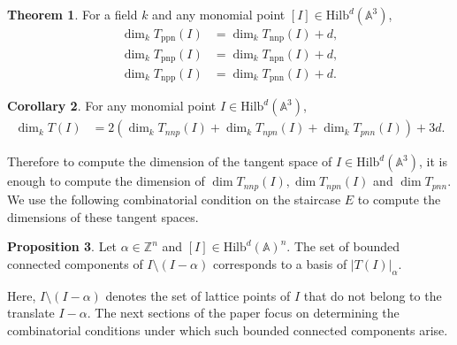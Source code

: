 \documentclass{amsart}[10pt]
\theoremstyle{plain}
\theoremstyle{definition}
\newtheorem{theorem}{Theorem}[section]
\newtheorem{corollary}[theorem]{Corollary}
\newtheorem{proposition}[theorem]{Proposition}
\newcommand{\Hilb}{\mathrm{Hilb}}
\begin{document}
\begin{theorem}
\cite[Theorem 2.4.]{AR}
For a field $k$ and any monomial point $[I] \in \Hilb^d (\mathbb{A}^3)$, 
\begin{align*}
\dim_{{k}} T_{\text{ppn}}(I) &= \dim_{{k}} T_{\text{nnp}}(I) + d, \\
\dim_{{k}} T_{\text{pnp}}(I) &= \dim_{{k}} T_{\text{npn}}(I) + d, \\
\dim_{{k}} T_{\text{npp}}(I) &= \dim_{{k}} T_{\text{pnn}}(I) + d.
\end{align*}
\end{theorem}

\begin{corollary}
For any monomial point $I \in \Hilb^d(\mathbb{A}^3)$, 
\begin{align*}
\dim_{k} T(I)
&=2(\dim_{k} T_{nnp}(I) +\dim_{k} T_{npn}(I)+\dim_{k} T_{pnn}(I))+3d. 
\end{align*}

\end{corollary}
Therefore to compute the dimension of the tangent space of $I \in \Hilb^d(\mathbb{A}^3)$, it is enough to compute the dimension of $\dim T_{nnp}(I), \dim T_{npn}(I)$ and $\dim T_{pnn}$. We use the following combinatorial condition on the staircase $E$ to compute the dimensions of these tangent spaces.

\begin{proposition}
\label{proptanspacedecom}
\cite[Proposition 1.5.]{AR}
Let $\alpha \in \mathbb{Z}^n$ and $[I] \in \Hilb^d (\mathbb{A})^n$. The set of bounded connected components of $I \setminus (I - \alpha)$ corresponds to a basis of $|T(I)|_\alpha$.
\end{proposition}


Here, $I \setminus (I-\alpha)$ denotes the set of lattice points of $I$ that do not belong to the translate $I-\alpha$.  The next sections of the paper focus on determining the combinatorial conditions under which such bounded connected components arise.
\end{document}
